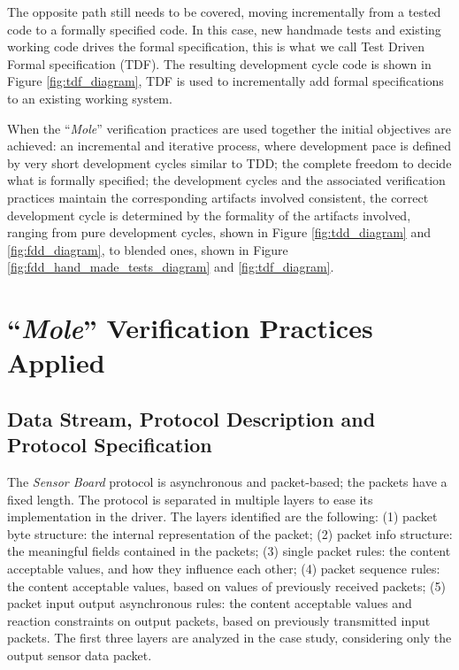 \documentclass[english]{lni}
\newcommand{\SB}{\emph{Sensor Board}\xspace}
\newcommand{\mole}{``\emph{Mole}''\xspace}
\begin{document}
The opposite path still needs to be covered, moving incrementally from a tested code to a formally specified code.
In this case, new handmade tests and existing working code drives the formal specification, this is what we call Test Driven Formal specification (TDF).
The resulting development cycle code is shown in Figure \ref{fig:tdf_diagram}, TDF is used to incrementally add formal specifications to an existing working system.

When the \mole verification practices are used together the initial objectives are achieved: an incremental and iterative process, where development pace is defined by very short development cycles similar to TDD; the complete freedom to decide what is formally specified; the development cycles and the associated verification practices maintain the corresponding artifacts involved consistent, the correct development cycle is determined by the formality of the artifacts involved, ranging from pure development cycles, shown in Figure \ref{fig:tdd_diagram} and \ref{fig:fdd_diagram}, to blended ones, shown in Figure \ref{fig:fdd_hand_made_tests_diagram} and \ref{fig:tdf_diagram}.



\section{\mole Verification Practices Applied}
\label{sec:a_complex_case_study}

\subsection{Data Stream, Protocol Description and Protocol Specification}
\label{subsec:data_stream_and_protocol_description}

The \SB protocol is asynchronous and packet-based; the packets have a fixed length.  
The protocol is separated in multiple layers to ease its implementation in the driver.
The layers identified are the following: (1) packet byte structure: the internal representation of the packet; (2) packet info structure: the meaningful fields contained in the packets; (3) single packet rules: the content acceptable values, and how they influence each other; (4) packet sequence rules: the content acceptable values, based on values of previously received packets; (5) packet input output asynchronous rules: the content acceptable values and reaction constraints on output packets, based on previously transmitted input packets.
The first three layers are analyzed in the case study, considering only the output sensor data packet.
\end{document}

